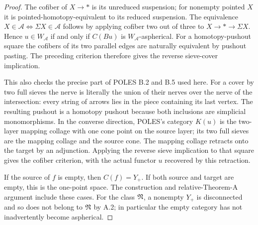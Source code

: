\begin{proof}
The cofiber of $X\to *$ is its unreduced suspension; for nonempty pointed $X$ it is pointed-homotopy-equivalent to its reduced suspension. The equivalence $X\in\mathcal A\Longleftrightarrow\Sigma X\in\mathcal A$ follows by applying cofiber two out of three to $X\to *\to\Sigma X$. Hence $u\in W_{\mathcal A}$ if and only if $C(Bu)$ is $W_{\mathcal A}$-aspherical. For a homotopy-pushout square the cofibers of its two parallel edges are naturally equivalent by pushout pasting. The preceding criterion therefore gives the reverse sieve-cover implication.

This also checks the precise part of POLES B.2 and B.5 used here. For a cover by two full sieves the nerve is literally the union of their nerves over the nerve of the intersection: every string of arrows lies in the piece containing its last vertex. The resulting pushout is a homotopy pushout because both inclusions are simplicial monomorphisms. In the converse direction, POLES's category $K(u)$ is the two-layer mapping collage with one cone point on the source layer; its two full sieves are the mapping collage and the source cone. The mapping collage retracts onto the target by an adjunction. Applying the reverse sieve implication to that square gives the cofiber criterion, with the actual functor $u$ recovered by this retraction.

If the source of $f$ is empty, then $C(f)=Y_+$. If both source and target are empty, this is the one-point space. The construction and relative-Theorem-A argument include these cases. For the class $\mathfrak N$, a nonempty $Y_+$ is disconnected and so does not belong to $\mathfrak N$ by A.2; in particular the empty category has not inadvertently become aspherical.
\end{proof}

